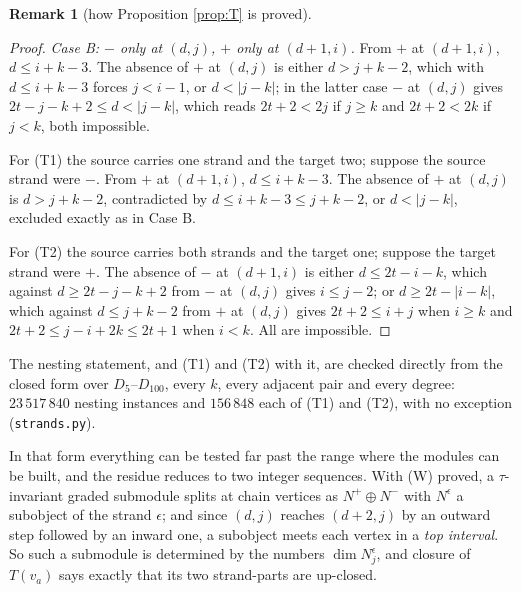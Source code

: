 \documentclass[11pt,reqno]{amsart}
\theoremstyle{plain}
\theoremstyle{definition}
\newtheorem{remark}[theorem]{Remark}
\begin{document}
\begin{remark}[how Proposition \ref{prop:T} is proved]
\begin{proof}
\emph{Case B: $-$ only at $(d,j)$, $+$ only at $(d+1,i)$.}  From $+$ at
$(d+1,i)$, $d\le i+k-3$.  The absence of $+$ at $(d,j)$ is either $d>j+k-2$,
which with $d\le i+k-3$ forces $j<i-1$, or $d<|j-k|$; in the latter case $-$ at
$(d,j)$ gives $2t-j-k+2\le d<|j-k|$, which reads $2t+2<2j$ if $j\ge k$ and
$2t+2<2k$ if $j<k$, both impossible.

For (T1) the source carries one strand and the target two; suppose the source
strand were $-$.  From $+$ at $(d+1,i)$, $d\le i+k-3$.  The absence of $+$ at
$(d,j)$ is $d>j+k-2$, contradicted by $d\le i+k-3\le j+k-2$, or $d<|j-k|$,
excluded exactly as in Case B.

For (T2) the source carries both strands and the target one; suppose the target
strand were $+$.  The absence of $-$ at $(d+1,i)$ is either $d\le 2t-i-k$,
which against $d\ge 2t-j-k+2$ from $-$ at $(d,j)$ gives $i\le j-2$; or
$d\ge 2t-|i-k|$, which against $d\le j+k-2$ from $+$ at $(d,j)$ gives
$2t+2\le i+j$ when $i\ge k$ and $2t+2\le j-i+2k\le 2t+1$ when $i<k$.  All are
impossible.
\end{proof}

The nesting statement, and (T1) and (T2) with it, are checked directly from the
closed form over $D_5$--$D_{100}$, every $k$, every adjacent pair and every
degree: $23\,517\,840$ nesting instances and $156\,848$ each of (T1) and (T2),
with no exception (\texttt{strands.py}).

In that form everything can be tested far past the range where the modules can
be built, and the residue reduces to two integer sequences.  With (W) proved, a
$\tau$-invariant graded submodule splits at chain vertices as
$N^{+}\oplus N^{-}$ with $N^{\epsilon}$ a subobject of the strand $\epsilon$;
and since $(d,j)$ reaches $(d+2,j)$ by an outward step followed by an inward
one, a subobject meets each vertex in a \emph{top interval}.  So such a
submodule is determined by the numbers $\dim N^{\epsilon}_j$, and closure of
$T(v_a)$ says exactly that its two strand-parts are up-closed.


\end{remark}
\end{document}
